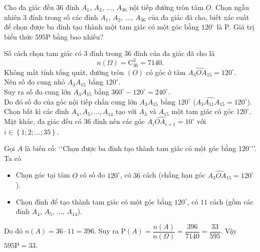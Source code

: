 \begin{ex}%
	Cho đa giác đều 36 đỉnh $A_1$, $A_2$, $\ldots$, $A_{36}$ nội tiếp đường tròn tâm $O$. Chọn ngẫu nhiên 3 đỉnh trong số các đỉnh $A_1$, $A_2$, $\ldots$, $A_{36}$ của đa giác đã cho, biết xác suất để chọn được ba đỉnh tạo thành một tam giác có một góc bằng $120^\circ$ là $\mathrm{P}$. Giá trị biểu thức $595 \mathrm{P}$ bằng bao nhiêu?	
	\loigiai
	{
		\immini
		{Số cách chọn tam giác có $3$ đỉnh trong $36$ đỉnh của đa giác đã cho là
		\[n(\Omega)= \mathrm{C}_{36}^3= 7140.\]
	Không mất tính tổng quát, đường tròn $(O)$ có góc ở tâm $\widehat{A_3OA_{15}}=120^\circ$.\\
	Nên số đo cung nhỏ $A_3A_{15}$ bằng $120^\circ$.\\
	Suy ra số đo cung lớn $A_3A_{15}$ bằng $360^\circ-120^\circ=240^\circ$.\\
	Do đó số đo của góc nội tiếp chắn cung lớn $A_3A_{15}$ bằng $120^\circ$ ($\widehat{A_3A_{11}A_{15}}=120^\circ$).\\
	Chọn bất kì các đỉnh $A_4,A_5,\ldots,A_{14}$ tạo với $A_3$ và $A_{15}$ một tam giác có góc $120^\circ$.\\
	Mặt khác, đa giác đều có $36$ đỉnh nên các góc $\widehat{A_iOA_{i+1}}=10^\circ$ với $i\in \left\{ 1; 2; \ldots; 35\right\}$.			
}{}
\noindent Gọi $A$ là biến cố: \lq\lq Chọn được ba đỉnh tạo thành tam giác có một góc bằng $120^\circ$\rq\rq. Ta có
\begin{itemize}
	\item Chọn góc tại tâm $O$ có số đo $120^\circ$, có $36$ cách (chẳng hạn góc $\widehat{A_3OA_{15}}=120^\circ$).
	\item Chọn đỉnh để tạo thành tam giác có một góc bằng $120^\circ$, có $11$ cách (gồm các đỉnh $A_4$, $A_5$, $\ldots$, $A_{14}$).
\end{itemize}
Do đó $n(A)= 36 \cdot 11= 396$. Suy ra $\mathrm{P}(A)= \dfrac{n(A)}{n(\Omega)}= \dfrac{396}{7140}= \dfrac{33}{595}$. Vậy $595 \mathrm{P}= 33$.
}
\end{ex}


